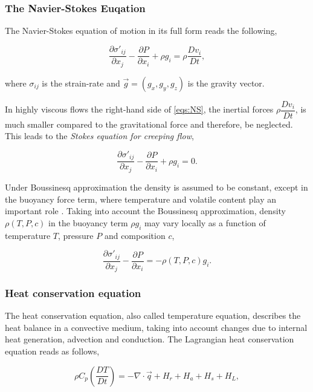 \subsubsection{The Navier-Stokes Euqation}

The Navier-Stokes equation of motion in its full form reads the following,

\begin{equation}\label{eqs:NS}
\dfrac{\partial \sigma'_{ij}}{\partial x_j} - \dfrac{\partial P}{\partial x_i} + \rho g_i = \rho \dfrac{D v_i}{D t},
\end{equation}

where $\sigma_{ij}$ is the strain-rate and $\vec{g} = \left(g_x,g_y,g_z\right)$ is the gravity vector.

In highly viscous flows the right-hand side of \eqref{eqs:NS}, the inertial forces $\rho \dfrac{D v_i}{D t}$, is much smaller compared to the gravitational force and therefore, be neglected. This leads to the \textit{Stokes equation for creeping flow},

\begin{equation}\label{eqs:Stokes}
\dfrac{\partial \sigma'_{ij}}{\partial x_j} - \dfrac{\partial P}{\partial x_i} + \rho g_i = 0.
\end{equation}

Under Boussinesq approximation the density is assumed to be constant, except in the buoyancy force term, where temperature and volatile content play an important role \citep{GeryaYuen2003}. Taking into account the Boussinesq approximation, density $\rho(T, P, c)$ in the buoyancy term $\rho g_i$ may vary locally as a function of temperature $T$, pressure $P$ and composition $c$,

\begin{equation}\label{eqs:Boussinesq}
\dfrac{\partial \sigma'_{ij}}{\partial x_j} - \dfrac{\partial P}{\partial x_i} = - \rho(T, P, c) g_i.
\end{equation}

\subsubsection{Heat conservation equation}

The heat conservation equation, also called temperature equation, describes the heat balance in a convective medium, taking into account changes due to internal heat generation, advection and conduction. The Lagrangian heat conservation equation reads as follows,

\begin{equation}
\rho C_p \left(\dfrac{D T}{D t}\right) = - \nabla \cdot \vec{q} + H_r + H_a + H_s + H_L,
\end{equation}

